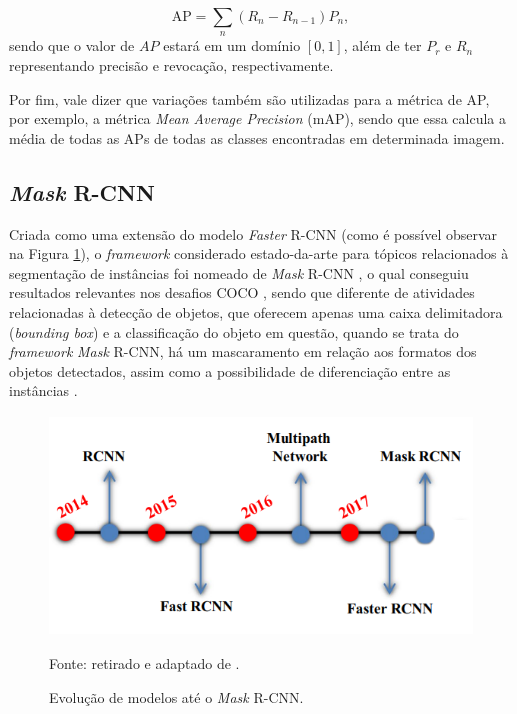 \begin{equation}
    \label{instance:eq:1}
    \text{AP} = \sum_n (R_n - R_{n-1}) P_n,
\end{equation}
sendo que o valor de $AP$ estará em um domínio $[0,1]$, além de ter $P_r$ e $R_n$ representando precisão e revocação, respectivamente.

Por fim, vale dizer que variações também são utilizadas para a métrica de AP, por exemplo, a métrica \textit{Mean Average Precision} (mAP), sendo que essa calcula a média de todas as APs de todas as classes encontradas em determinada imagem.


\subsection{\textit{Mask} R-CNN}
\label{instance:mask}

Criada como uma extensão do modelo \textit{Faster} R-CNN \cite{Ren2017} (como é possível observar na Figura \ref{instance:fig:5}), o \textit{framework} considerado estado-da-arte para tópicos relacionados à segmentação de instâncias foi nomeado de \textit{Mask} R-CNN \cite{He2020}, o qual conseguiu resultados relevantes nos desafios COCO \cite{Lin2016}, sendo que diferente de atividades relacionadas à detecção de objetos, que oferecem apenas uma caixa delimitadora (\textit{bounding box}) e a classificação do objeto em questão, quando se trata do \textit{framework} \textit{Mask} R-CNN, há um mascaramento em relação aos formatos dos objetos detectados, assim como a possibilidade de diferenciação entre as instâncias \cite{Hafiz2020}.

\begin{figure}[H]
    \centering
    \caption{Evolução de modelos até o \textit{Mask} R-CNN.}
    \includegraphics[height=2.3in]{recursos/imagens/instance/mask_rcnn_evol.png}
    \label{instance:fig:5}

    \vspace*{1 cm}
    Fonte: retirado e adaptado de \cite{Hafiz2020}.
\end{figure}

